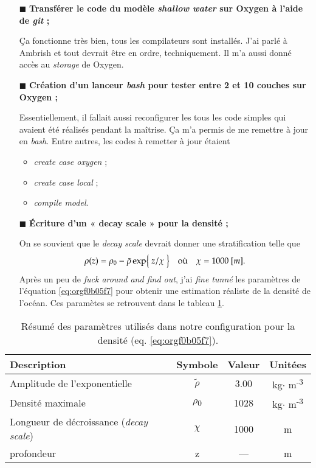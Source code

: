 \documentclass[10pt]{article}
\numberwithin{equation}{section}
\renewcommand{\boxtimes}{\blacksquare}
\newcommand{\tall}{\vphantom{A^{x^x}_p}}
\begin{document}
\begin{itemize}
\item[{$\boxtimes$}] \textbf{Transférer le code du modèle \emph{shallow water} sur Oxygen à l'aide de \emph{git} ;}

Ça fonctionne très bien, tous les compilateurs sont installés.
J'ai parlé à Ambrish et tout devrait être en ordre, techniquement.
Il m'a aussi donné accès au \emph{storage} de Oxygen.\bigskip

\item[{$\boxtimes$}] \textbf{Création d'un lanceur \emph{bash} pour tester entre 2 et 10 couches sur Oxygen ;}

Essentiellement, il fallait aussi reconfigurer les tous les code simples qui avaient été réalisés pendant la maîtrise.
Ça m'a permis de me remettre à jour en \emph{bash}.
Entre autres, les codes à remetter à jour étaient
\begin{itemize}
\item \emph{create case oxygen} ;
\item \emph{create case local} ;
\item \emph{compile model}.\bigskip
\end{itemize}

\item[{$\boxtimes$}] \textbf{Écriture d'un « decay scale » pour la densité ;}

On se souvient que le \emph{decay scale} devrait donner une stratification telle que
\begin{align}
\label{eq:orgf0b05f7}
  && \rho(z) = \rho_0 - \tilde{\rho}\exp{\ z/\chi\tall\ } && \text{où} && \chi = 1000\ [m]. &&
\end{align}
Après un peu de \emph{fuck around and find out}, j'ai \emph{fine tunné} les paramètres de l'équation \ref{eq:orgf0b05f7} pour obtenir une estimation réaliste de la densité de l'océan.
Ces paramètes se retrouvent dans le tableau \ref{tab:orgc8019b0}.\bigskip
\end{itemize}

\begin{table}[htbp]
\caption{\label{tab:orgc8019b0}Résumé des paramètres utilisés dans notre configuration pour la densité (eq. \ref{eq:orgf0b05f7}).}
\centering
\begin{tabular}{lccc}
\hline
\hline
Description & Symbole & Valeur & Unitées\\[0pt]
\hline
Amplitude de l'exponentielle & \(\tilde{\rho}\) & 3.00 & kg\(\cdot\) m\textsuperscript{-3}\\[0pt]
Densité maximale & \(\rho\)\textsubscript{0} & 1028 & kg\(\cdot\) m\textsuperscript{-3}\\[0pt]
Longueur de décroissance (\emph{decay scale}) & \(\chi\) & 1000 & m\\[0pt]
profondeur & z & --- & m\\[0pt]
\hline
\end{tabular}
\end{table}
\end{document}

